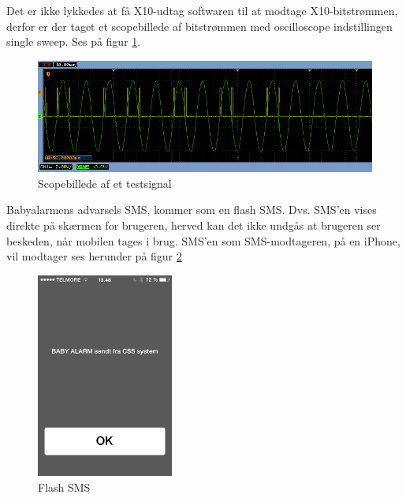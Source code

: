 Det er ikke lykkedes at få X10-udtag softwaren til at modtage X10-bitstrømmen, derfor er der taget et scopebillede af bitstrømmen med oscilloscope indstillingen single sweep. Ses på figur \ref{fig:Scop_test}.

\begin{figure}[htbp]
  \centering
    \includegraphics[width=\textwidth]{billeder/Modtager_0101_ON}
    \caption{Scopebillede af et testsignal}
    \label{fig:Scop_test}
\end{figure}

 
 
Babyalarmens advarsels SMS, kommer som en flash SMS. Dvs. SMS'en vises direkte på skærmen for brugeren, herved kan det ikke undgås at brugeren ser beskeden, når mobilen tages i brug. SMS'en som SMS-modtageren, på en iPhone, vil modtager ses herunder på figur \ref{fig:flashSMS}
 
\begin{figure}[htbp]
  \centering
    \includegraphics[width=0.4\textwidth]{billeder/flashSMS}
    \caption{Flash SMS}
    \label{fig:flashSMS}
\end{figure}
 


